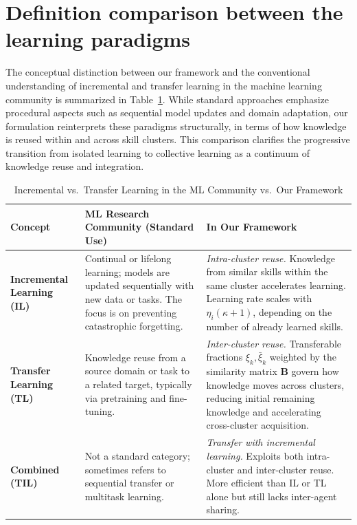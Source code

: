 \section{Definition comparison between the learning paradigms}
The conceptual distinction between our framework and the conventional understanding of incremental and transfer learning in the machine learning community is summarized in Table~\ref{tab:IL_TL}. While standard approaches emphasize procedural aspects such as sequential model updates and domain adaptation, our formulation reinterprets these paradigms structurally, in terms of how knowledge is reused within and across skill clusters. This comparison clarifies the progressive transition from isolated learning to collective learning as a continuum of knowledge reuse and integration.

\begin{table}[ht]
    \centering
    \scriptsize %
    \renewcommand{\arraystretch}{1.3}
    \caption{Incremental vs.\ Transfer Learning in the ML Community vs.\ Our Framework}
    \label{tab:IL_TL}
    \begin{adjustbox}{width=\textwidth}
        \begin{tabularx}{\textwidth}{lXX}
            \toprule
            \textbf{Concept} & \textbf{ML Research Community (Standard Use)} & \textbf{In Our Framework} \\
            \midrule
            \textbf{Incremental Learning (IL)} &
            Continual or lifelong learning; models are updated sequentially with new data or tasks. The focus is on preventing catastrophic forgetting. &
            \textit{Intra-cluster reuse.} Knowledge from similar skills within the same cluster accelerates learning. Learning rate scales with $\eta_i(\kappa+1)$, depending on the number of already learned skills. \\
            \addlinespace
            \textbf{Transfer Learning (TL)} &
            Knowledge reuse from a source domain or task to a related target, typically via pretraining and fine-tuning. &
            \textit{Inter-cluster reuse.} Transferable fractions $\xi_k, \bar{\xi}_k$ weighted by the similarity matrix $\bm{B}$ govern how knowledge moves across clusters, reducing initial remaining knowledge and accelerating cross-cluster acquisition. \\
            \addlinespace
            \textbf{Combined (TIL)} &
            Not a standard category; sometimes refers to sequential transfer or multitask learning. &
            \textit{Transfer with incremental learning.} Exploits both intra-cluster and inter-cluster reuse. More efficient than IL or TL alone but still lacks inter-agent sharing. \\

\end{tabularx}
\end{adjustbox}
\end{table}
